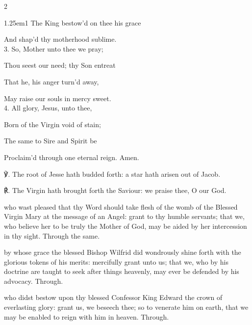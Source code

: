 \begin{paracol}{2}
\begin{hangparas}{1.25em}{1}
The King bestow'd on thee his grace

And shap'd thy motherhood sublime.\\

3. So, Mother unto thee we pray;

Thou seest our need; thy Son entreat

That he, his anger turn'd away,

May raise our souls in mercy sweet.\\

4. All glory, Jesus, unto thee,

Born of the Virgin void of stain;

The same to Sire and Spirit be

Proclaim'd through one eternal reign. Amen.\\
\end{hangparas}

℣. The root of Jesse hath budded forth: a star hath arisen out of Jacob.

℟. The Virgin hath brought forth the Saviour: we praise thee, O our God.


\fussy	
\end{paracol}


\collect
{} who wast pleased that thy Word should take flesh of the womb of the Blessed Virgin Mary at the message of an Angel: grant to thy humble servants; that we, who believe her to be truly the Mother of God, may be aided by her intercession in thy sight. Through the same.



\memorialCollect
{} by whose grace the blessed Bishop Wilfrid did wondrously shine forth with the glorious tokens of his merits: mercifully grant unto us; that we, who by his doctrine are taught to seek after things heavenly, may ever be defended by his advocacy. Through.



\memorialCollect
{} who didst bestow upon thy blessed Confessor King Edward the crown of everlasting glory: grant us, we beseech thee; so to venerate him on earth, that we may be enabled to reign with him in heaven. Through.


